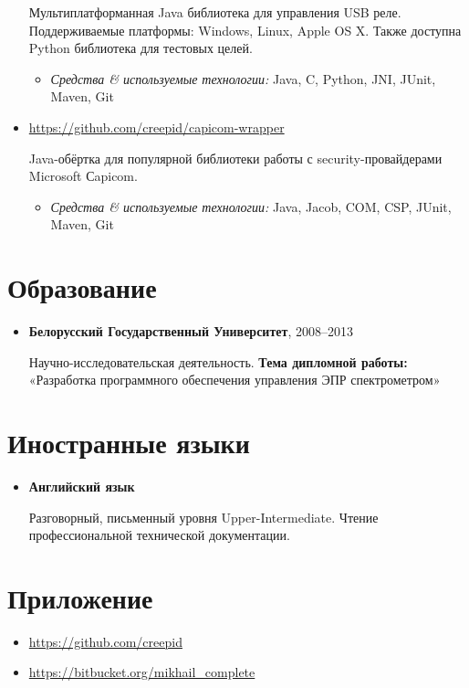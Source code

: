 \documentclass[a4paper, 12pt]{article}
\newcommand{\position}[1]{
    \textbf{#1}}
\newcommand{\itemlabel}[1]{
    \textit{#1:}}
\begin{document}
\begin{itemize}
            Мультиплатформанная Java библиотека для управления USB реле. \newline Поддерживаемые платформы: Windows, Linux, Apple OS X. \newline  Также доступна Python библиотека для тестовых целей.

            \begin{itemize}
                \item \itemlabel{Средства \& используемые технологии} Java, C, Python, JNI, JUnit, Maven, Git
            \end{itemize}
            
            \item \href{https://github.com/creepid/capicom-wrapper}{https://github.com/creepid/capicom-wrapper}

           Java-обёртка для популярной библиотеки работы с security-провайдерами Microsoft Сapicom.

            \begin{itemize}
                \item \itemlabel{Средства \& используемые технологии} Java, Jacob, COM, CSP, JUnit, Maven, Git
            \end{itemize}
            
    \end{itemize}    

\section*{Образование}

    \begin{itemize}

        \item \position{Белорусский Государственный Университет}, 2008--2013

            Научно-исследовательская деятельность.
             \newline\textbf{Тема дипломной работы:} 
             \newline «Разработка программного обеспечения управления ЭПР спектрометром»
    \end{itemize}
    
\section*{Иностранные языки}
 	\begin{itemize}
 		 \item \position{Английский язык}
 		 
 		 Разговорный, письменный уровня Upper-Intermediate. Чтение профессиональной технической документации.  
 	\end{itemize} 

\section*{Приложение}

    \begin{itemize}
        \item \href{https://github.com/creepid}{https://github.com/creepid}
    \end{itemize}
        \begin{itemize}
        \item \href{https://bitbucket.org/mikhail_complete}{https://bitbucket.org/mikhail\_complete}
    \end{itemize}
\end{document}

